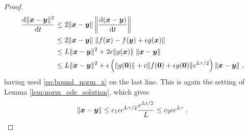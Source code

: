 \begin{proof}
     \begin{align*}
     \dv{\lVert \bm{x}- \bm{y}\rVert^2}{t}  & \leq 2  \lVert \bm{x} - \bm{y} \rVert \left\lVert \dv{( \bm{x}- \bm{y})}{t}  \right\rVert\\
    &\leq 2 \lVert \bm{x} - \bm{y} \rVert \; \lVert f( \bm{x} ) - f( \bm{y} ) + \epsilon g( \bm{x} ) \rVert \\
    &\leq L  \lVert \bm{x} - \bm{y} \rVert^2 + 2 \epsilon \lVert g( \bm{x} ) \rVert \; \lVert \bm{x} - \bm{y} \rVert \\
    &\leq L \lVert \bm{x} - \bm{y} \rVert^2 +  \epsilon \left( \lVert g( \bm{0} ) \rVert + c\lVert f( \bm{0} ) + \epsilon g( \bm{0} ) \rVert e^{L\tau/2} \right) \lVert \bm{x} - \bm{y} \rVert \;,
    \end{align*}
    having used \eqref{eq:bound_norm_x} on the last line.
    This is again the setting of Lemma \ref{lem:norm_ode_solution}, which gives
      \begin{equation}
        \nonumber
        \lVert \bm{x} - \bm{y} \rVert \leq c_1 \epsilon e^{L\tau/2} \frac{e^{Lt/2}}{L} \leq c_2 \epsilon e^{L\tau} \;.
    \end{equation}
\end{proof}

